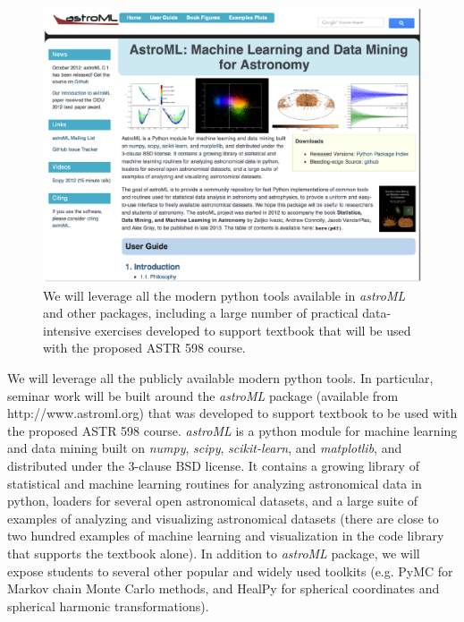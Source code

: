 \begin{figure}[!t]
\vskip -1.8in
\includegraphics[width=1.02\hsize,clip]{astroML.eps}
\vskip -2.0in
\caption{We will leverage all the modern python tools available in {\it astroML} and
other packages, including a large number of practical data-intensive exercises developed to
support textbook that will be used with the proposed ASTR 598 course.} 
\label{Fig:astroML}
\end{figure}


We will leverage all the publicly available modern python tools. In particular, seminar work will be 
built around the {\it astroML} package (available from http://www.astroml.org) that was developed 
to support textbook to be used with the proposed ASTR 598 course. {\it astroML} is a python module 
for machine learning and data mining built on {\it numpy}, {\it scipy}, {\it scikit-learn}, and {\it matplotlib}, 
and distributed under the 3-clause BSD license. It contains a growing library of statistical and machine 
learning routines for analyzing astronomical data in python, loaders for several open astronomical datasets, 
and a large suite of examples of analyzing and visualizing astronomical datasets (there are close to two 
hundred examples of machine learning and visualization in the code library that supports the textbook 
alone). In addition to  {\it astroML} package, we will expose students to several other popular and widely
used toolkits (e.g. PyMC for Markov chain Monte Carlo methods, and HealPy for spherical coordinates 
and spherical harmonic transformations). 

